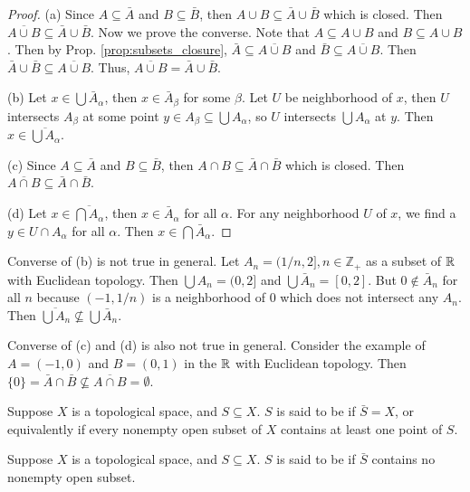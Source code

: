\documentclass[11pt,a4paper]{article}
\begin{document}
\begin{proof}
(a) Since $A\subseteq \bar{A}$ and $B\subseteq \bar{B}$, then $A\cup B\subseteq \bar{A}\cup \bar{B}$ which is closed. Then $\overline{A\cup B}\subseteq \bar{A}\cup\bar{B}$. Now we prove the converse. Note that $A\subseteq A\cup B$ and $B\subseteq A\cup B$. Then by Prop. \ref{prop:subsets_closure}, $\bar{A}\subseteq \overline{A\cup B}$ and $\bar{B}\subseteq \overline{A\cup B}$. Then $\bar{A}\cup\bar{B}\subseteq \overline{A\cup B}$. Thus, $\overline{A\cup B} = \bar{A}\cup \bar{B}$.

(b) Let $x\in \bigcup \bar{A}_\alpha$, then $x\in \bar{A}_\beta$ for some $\beta$. Let $U$ be neighborhood of $x$, then $U$ intersects $A_\beta$ at some point $y\in A_\beta\subseteq \bigcup A_\alpha$, so $U$ intersects $\bigcup A_\alpha$ at $y$. Then $x\in \overline{\bigcup A_\alpha}$.

(c) Since $A\subseteq \bar{A}$ and $B\subseteq \bar{B}$, then $A\cap B\subseteq \bar{A}\cap \bar{B}$ which is closed. Then $\overline{A\cap B}\subseteq \bar{A}\cap\bar{B}$.

(d) Let $x\in \overline{\bigcap A_\alpha}$, then $x\in \bar{A}_\alpha$ for all $\alpha$. For any neighborhood $U$ of $x$, we find a $y\in U\cap A_\alpha$ for all $\alpha$. Then $x\in \bigcap \bar{A}_\alpha$.
\end{proof}

\begin{remark}
Converse of (b) is not true in general. Let $A_n = (1/n,2], n\in \mathbb{Z}_+$ as a subset of $\mathbb{R}$ with Euclidean topology. Then $\bigcup A_n = (0,2]$ and $\bigcup \bar{A}_n = [0,2]$. 
But $0\notin \bar{A}_n$ for all $n$ because $(-1,1/n)$ is a neighborhood of $0$ which does not intersect any $A_n$. 
Then $\overline{\bigcup A_n}\nsubseteq \bigcup\bar{A}_n$.

Converse of (c) and (d) is also not true in general. Consider the example of $A = (-1,0)$ and $B = (0,1)$ in the $\mathbb{R}$ with Euclidean topology. Then $\{0\} = \bar{A}\cap\bar{B} \nsubseteq \overline{A\cap B} = \emptyset$.
\end{remark}

\begin{mydef}
Suppose $X$ is a topological space, and $S\subseteq X$. $S$ is said to be  if $\bar{S}=X$, or equivalently if every nonempty open subset of $X$ contains at least one point of $S$.
\end{mydef}

\begin{mydef}
Suppose $X$ is a topological space, and $S\subseteq X$. $S$ is said to be  if $\bar{S}$ contains no nonempty open subset.
\end{mydef}
\end{document}
